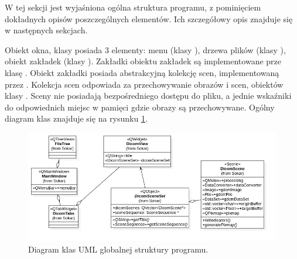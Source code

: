 
\par
W tej sekcji jest wyjaśniona ogólna struktura programu, z pominięciem dokładnych opisów poszczególnych elementów.
Ich szczegółowy opis znajduje się w następnych sekcjach.
\par
Obiekt okna, klasy  posiada 3 elementy: menu (klasy ), drzewa plików (klasy ), obiekt zakładek (klasy ).
Zakładki obiektu zakładek są implementowane prze klasę .
Obiekt zakładki posiada abstrakcyjną kolekcję scen, implementowaną przez .
Kolekcja scen odpowiada za przechowywanie obrazów i scen, obiektów klasy .
Sceny nie posiadają bezpośredniego dostępu do pliku, a jednie wskaźniki do odpowiednich miejsc w pamięci gdzie obrazy są przechowywane.
Ogólny diagram klas znajduje się na rysunku \ref{fig:uml-global-sturcture}.

\begin{figure}[!htbp]
    \centering
    \includegraphics[width=\textwidth]{img/uml/global-sturcture.png}
    \caption{Diagram klas UML globalnej struktury programu.}
    \label{fig:uml-global-sturcture}
\end{figure}
